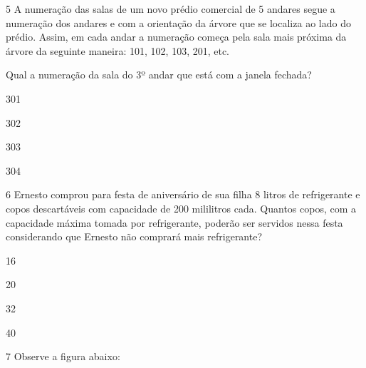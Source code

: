 \num{5} A numeração das salas de um novo prédio comercial de 5 andares
segue a numeração dos andares e com a orientação da árvore que se
localiza ao lado do prédio. Assim, em cada andar a numeração começa pela
sala mais próxima da árvore da seguinte maneira: 101, 102, 103, 201,
etc.


Qual a numeração da sala do 3º andar que está com a janela fechada?

\begin{escolha}
\item
  301
\item
  302
\item
  303
\item
  304
\end{escolha}


\num{6} Ernesto comprou para festa de aniversário de sua filha 8 litros de
refrigerante e copos descartáveis com capacidade de 200 mililitros cada.
Quantos copos, com a capacidade máxima tomada por refrigerante, poderão
ser servidos nessa festa considerando que Ernesto não comprará mais
refrigerante?

\begin{escolha}
\item
  16
\item
  20
\item
  32
\item
  40
\end{escolha}


\num{7} Observe a figura abaixo:


